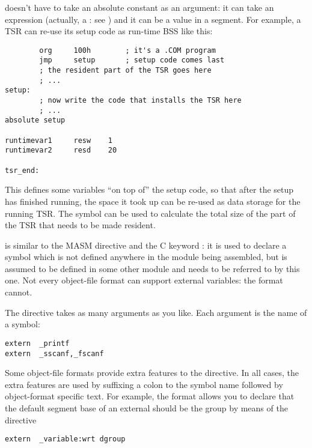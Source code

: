  doesn't have to take an absolute constant as an
argument: it can take an expression (actually, a : see ) and it can be a value in a segment.
For example, a TSR can re-use its setup code as run-time BSS like this:

\begin{lstlisting}
        org     100h        ; it's a .COM program
        jmp     setup       ; setup code comes last
        ; the resident part of the TSR goes here
        ; ...
setup:
        ; now write the code that installs the TSR here
        ; ...
absolute setup

runtimevar1     resw    1
runtimevar2     resd    20

tsr_end:
\end{lstlisting}

This defines some variables ``on top of'' the setup code, so that
after the setup has finished running, the space it took up can be
re-used as data storage for the running TSR. The symbol
 can be used to calculate the total size of
the part of the TSR that needs to be made resident.


 is similar to the MASM directive  and
the C keyword : it is used to declare a symbol which
is not defined anywhere in the module being assembled, but is assumed
to be defined in some other module and needs to be referred to by this
one. Not every object-file format can support external variables:
the  format cannot.

The  directive takes as many arguments as you like.
Each argument is the name of a symbol:

\begin{lstlisting}
extern  _printf
extern  _sscanf,_fscanf
\end{lstlisting}

Some object-file formats provide extra features to the 
directive. In all cases, the extra features are used by suffixing a
colon to the symbol name followed by object-format specific text.
For example, the  format allows you to declare that the
default segment base of an external should be the group 
by means of the directive

\begin{lstlisting}
extern  _variable:wrt dgroup
\end{lstlisting}

